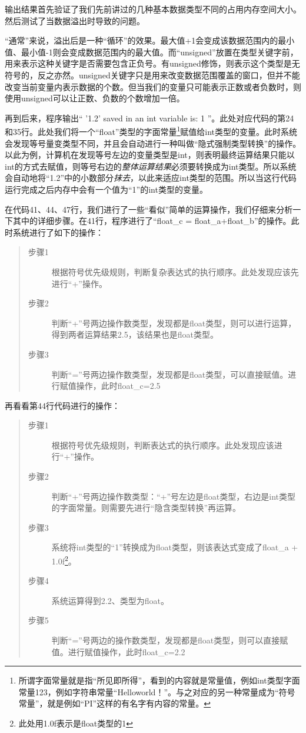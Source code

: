 输出结果首先验证了我们先前讲过的几种基本数据类型不同的占用内存空间大小。然后测试了当数据溢出时导致的问题。

“通常”来说，溢出后是一种“循环”的效果。最大值+1会变成该数据范围内的最小值、最小值-1则会变成数据范围内的最大值。而“unsigned”放置在类型关键字前，用来表示这种关键字是否需要包含正负号。有unsigned修饰，则表示这个类型是无符号的，反之亦然。unsigned关键字只是用来改变数据范围覆盖的窗口，但并不能改变当前变量内表示数据的个数。但当我们的变量只可能表示正数或者负数时，则使用unsigned可以让正数、负数的个数增加一倍。

再到后来，程序输出“ '1.2' saved in an int variable is: 1 ”。此处对应代码的第24和35行。此处我们将一个“float”类型的字面常量\footnote{所谓字面常量就是指“所见即所得”，看到的内容就是常量值，例如int类型字面常量123，例如字符串常量“Helloworld！”。与之对应的另一种常量成为“符号常量”，就是例如“PI”这样的有名字有内容的常量。}赋值给int类型的变量。此时系统会发现等号量变类型不同，并且会自动进行一种叫做“隐式强制类型转换”的操作。以此为例，计算机在发现等号左边的变量类型是int，则表明最终运算结果只能以int的方式去赋值，则等号右边的\emph{整体运算结果}必须要转换成为int类型。所以系统会自动地将“1.2”中的小数部分\emph{抹去}，以此来适应int类型的范围。所以当这行代码运行完成之后内存中会有一个值为“1”的int类型的变量。

在代码41、44、47行，我们进行了一些“看似”简单的运算操作，我们仔细来分析一下其中的详细步骤。在41行，程序进行了“float\_c = float\_a+float\_b”的操作。此时系统进行了如下的操作：
\begin{quote}
	\begin{description}
		\item[步骤1] 根据符号优先级规则，判断复杂表达式的执行顺序。此处发现应该先进行“+”操作。
		\item[步骤2] 判断“+”号两边操作数类型，发现都是float类型，则可以进行运算，得到两者运算结果2.5，该结果也是float类型。
		\item[步骤3] 判断“=”号两边操作数类型，发现都是float类型，可以直接赋值。进行赋值操作，此时float\_c=2.5
	\end{description}
\end{quote}

再看看第44行代码进行的操作：
\begin{quote}
	\begin{description}
		\item[步骤1] 根据符号优先级规则，判断表达式的执行顺序。此处发现应该进行“+”操作。
		\item[步骤2] 判断“+”号两边操作数类型：“+”号左边是float类型，右边是int类型的字面常量。则需要先进行“隐含类型转换”再运算。
		\item[步骤3] 系统将int类型的“1”转换成为float类型，则该表达式变成了float\_a + 1.0f\footnote{此处用1.0f表示是float类型的1}。
		\item[步骤4] 系统运算得到2.2、类型为float。
		\item[步骤5] 判断“=”号两边的操作数类型，发现都是float类型，则可以直接赋值。进行赋值操作，此时float\_c=2.2
	\end{description}
\end{quote}

